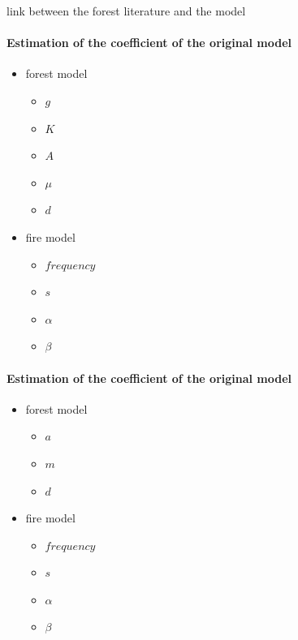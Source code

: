 \documentclass{article}
\begin{document}
link between the forest literature and the model

\paragraph{Estimation of the coefficient of the original model}

\begin{itemize}
    \item forest model
    \begin{itemize}
        \item $g$
        \item $K$
        \item $A$
        \item $\mu$
        \item $d$
    \end{itemize}
    \item fire model
    \begin{itemize}
        \item $frequency$
        \item $s$
        \item $\alpha$
        \item $\beta$
    \end{itemize}
\end{itemize}



\paragraph{Estimation of the coefficient of the original model}

\begin{itemize}
    \item forest model
    \begin{itemize}
        \item $a$ 
        \item $m$ 
        \item $d$
    \end{itemize}
    \item fire model
    \begin{itemize}
        \item $frequency$ 
        \item $s$
        \item $\alpha$
        \item $\beta$
    \end{itemize}
\end{itemize}
\end{document}
